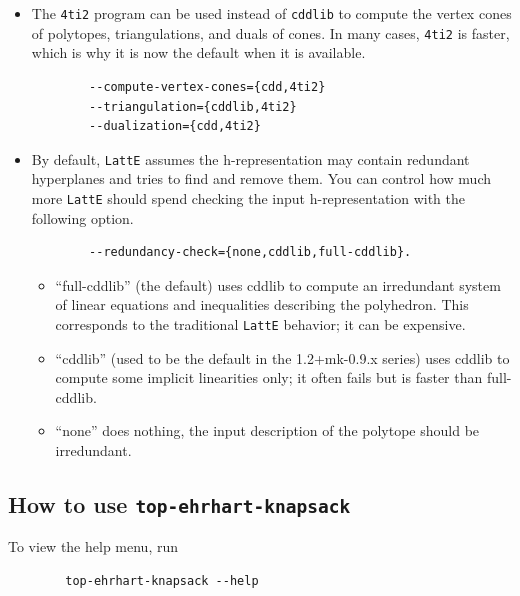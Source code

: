 \documentclass{article}
\newcommand{\latte}{{\tt LattE}\xspace}
\newcommand{\fourtitwo}{{\tt 4ti2}\xspace}
\begin{document}
\begin{itemize}
\item The \fourtitwo program can be used instead of {\tt cddlib} %
  to compute the vertex cones of polytopes, triangulations, and duals of cones.
  In many cases, \fourtitwo is faster, which is why it is now the default when
  it is available.
  
  \begin{verbatim}
        --compute-vertex-cones={cdd,4ti2}
        --triangulation={cddlib,4ti2}
        --dualization={cdd,4ti2}
  \end{verbatim}

\item By default, \latte assumes the h-representation may contain redundant hyperplanes and tries to find and remove them. You can control how much more \latte should spend checking the input h-representation with the following option.

        \begin{verbatim}
        --redundancy-check={none,cddlib,full-cddlib}.
        \end{verbatim}

        \begin{itemize}
        \item ``full-cddlib'' (the default) uses cddlib to compute an irredundant
    system of linear equations and inequalities describing the
    polyhedron.  This corresponds to the traditional \latte behavior;
    it can be expensive.

        \item ``cddlib'' (used to be the default in the 1.2+mk-0.9.x series) uses
    cddlib to compute some implicit linearities only; it often fails
    but is faster than full-cddlib.

        \item ``none'' does nothing, the input description of the polytope should
    be irredundant.
                
        \end{itemize}

\end{itemize}


\subsection{How to use {\tt top-ehrhart-knapsack}}


 To view the help menu, run

\begin{verbatim}
        top-ehrhart-knapsack --help
\end{verbatim}  
\end{document}
